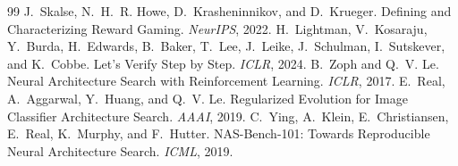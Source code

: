 \documentclass[11pt]{article}
\begin{document}
\begin{thebibliography}{99}
 J.~Skalse, N.~H.~R. Howe, D.~Krasheninnikov, and D.~Krueger. Defining and Characterizing Reward Gaming. \emph{NeurIPS}, 2022.
 H.~Lightman, V.~Kosaraju, Y.~Burda, H.~Edwards, B.~Baker, T.~Lee, J.~Leike, J.~Schulman, I.~Sutskever, and K.~Cobbe. Let's Verify Step by Step. \emph{ICLR}, 2024.
 B.~Zoph and Q.~V. Le. Neural Architecture Search with Reinforcement Learning. \emph{ICLR}, 2017.
 E.~Real, A.~Aggarwal, Y.~Huang, and Q.~V. Le. Regularized Evolution for Image Classifier Architecture Search. \emph{AAAI}, 2019.
 C.~Ying, A.~Klein, E.~Christiansen, E.~Real, K.~Murphy, and F.~Hutter. NAS-Bench-101: Towards Reproducible Neural Architecture Search. \emph{ICML}, 2019.
\end{thebibliography}
\end{document}

